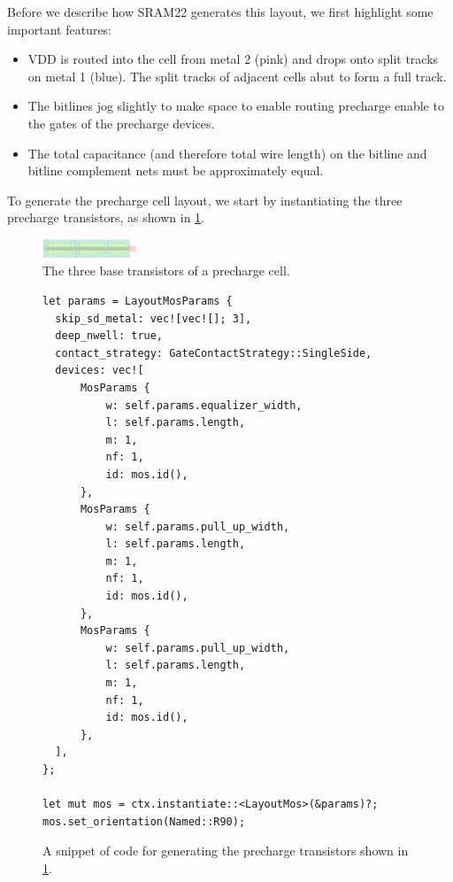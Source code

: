 Before we describe how SRAM22 generates this layout, we first highlight some important features:
\begin{itemize}
\item VDD is routed into the cell from metal 2 (pink) and drops onto split tracks on metal 1 (blue).
  The split tracks of adjacent cells abut to form a full track.
\item The bitlines jog slightly to make space to enable routing precharge enable to the gates of the precharge devices.
\item The total capacitance (and therefore total wire length) on the bitline and bitline complement nets must be approximately equal.
\end{itemize}

To generate the precharge cell layout, we start by instantiating the three precharge transistors, as shown in \ref{fig:precharge-transistors}.

\begin{figure}[H] \centering
\includegraphics[width=0.25\textwidth]{figures/precharge_transistors.png}
\caption{The three base transistors of a precharge cell. \label{fig:precharge-transistors}}
\end{figure}

\begin{figure}[H] \centering
\begin{verbatim}
let params = LayoutMosParams {
  skip_sd_metal: vec![vec![]; 3],
  deep_nwell: true,
  contact_strategy: GateContactStrategy::SingleSide,
  devices: vec![
      MosParams {
          w: self.params.equalizer_width,
          l: self.params.length,
          m: 1,
          nf: 1,
          id: mos.id(),
      },
      MosParams {
          w: self.params.pull_up_width,
          l: self.params.length,
          m: 1,
          nf: 1,
          id: mos.id(),
      },
      MosParams {
          w: self.params.pull_up_width,
          l: self.params.length,
          m: 1,
          nf: 1,
          id: mos.id(),
      },
  ],
};

let mut mos = ctx.instantiate::<LayoutMos>(&params)?;
mos.set_orientation(Named::R90);
\end{verbatim}
\caption{A snippet of code for generating the precharge transistors shown in \ref{fig:precharge-transistors}. \label{fig:precharge-transistors-code}}
\end{figure}

